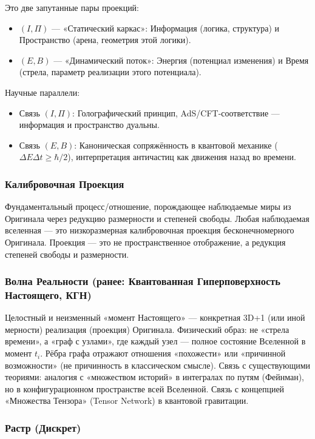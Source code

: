 \documentclass[a4paper,12pt]{article}
\begin{document}
Это две запутанные пары проекций:
\begin{itemize}
	\item $(I, \Pi)$ — «Статический каркас»: Информация (логика, структура) и Пространство (арена, геометрия этой логики).
	\item $(E, B)$ — «Динамический поток»: Энергия (потенциал изменения) и Время (стрела, параметр реализации этого потенциала).
\end{itemize}

Научные параллели:
\begin{itemize}
	\item Связь $(I, \Pi)$: Голографический принцип, AdS/CFT-соответствие — информация и пространство дуальны.
	\item Связь $(E, B)$: Каноническая сопряжённость в квантовой механике ($\Delta E \Delta t \geq \hbar/2$), интерпретация античастиц как движения назад во времени.
\end{itemize}

\subsubsection{Калибровочная Проекция}

Фундаментальный процесс/отношение, порождающее наблюдаемые миры из Оригинала через редукцию размерности и степеней свободы. Любая наблюдаемая вселенная — это низкоразмерная калибровочная проекция бесконечномерного Оригинала. Проекция — это не пространственное отображение, а редукция степеней свободы и размерности.

\subsubsection{Волна Реальности (ранее: Квантованная Гиперповерхность Настоящего, КГН)}

Целостный и неизменный «момент Настоящего» — конкретная 3D+1 (или иной мерности) реализация (проекция) Оригинала. Физический образ: не «стрела времени», а «граф с узлами», где каждый узел — полное состояние Вселенной в момент $t_i$. Рёбра графа отражают отношения «похожести» или «причинной возможности» (не причинность в классическом смысле). Связь с существующими теориями: аналогия с «множеством историй» в интегралах по путям (Фейнман), но в конфигурационном пространстве всей Вселенной. Связь с концепцией «Множества Тензора» (Tensor Network) в квантовой гравитации.

\subsubsection{Растр (Дискрет)}
\end{document}

